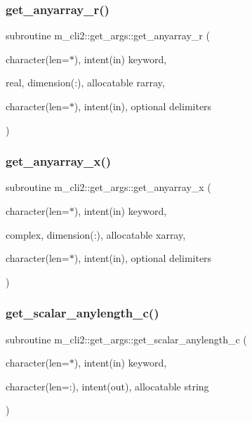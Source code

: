 \subsubsection{\texorpdfstring{get\+\_\+anyarray\+\_\+r()}{get\_anyarray\_r()}}
{\footnotesize\ttfamily subroutine m\+\_\+cli2\+::get\+\_\+args\+::get\+\_\+anyarray\+\_\+r (\begin{DoxyParamCaption}\item[{character(len=$\ast$), intent(in)}]{keyword,  }\item[{real, dimension(\+:), allocatable}]{rarray,  }\item[{character(len=$\ast$), intent(in), optional}]{delimiters }\end{DoxyParamCaption})\hspace{0.3cm}{\ttfamily [private]}}

\mbox{\label{interfacem__cli2_1_1get__args_a8581641c551aa6fe4c0592fb63de11fe}} 
\subsubsection{\texorpdfstring{get\+\_\+anyarray\+\_\+x()}{get\_anyarray\_x()}}
{\footnotesize\ttfamily subroutine m\+\_\+cli2\+::get\+\_\+args\+::get\+\_\+anyarray\+\_\+x (\begin{DoxyParamCaption}\item[{character(len=$\ast$), intent(in)}]{keyword,  }\item[{complex, dimension(\+:), allocatable}]{xarray,  }\item[{character(len=$\ast$), intent(in), optional}]{delimiters }\end{DoxyParamCaption})\hspace{0.3cm}{\ttfamily [private]}}

\mbox{\label{interfacem__cli2_1_1get__args_a42c3b7050881edf76682b7b0058b868a}} 
\subsubsection{\texorpdfstring{get\+\_\+scalar\+\_\+anylength\+\_\+c()}{get\_scalar\_anylength\_c()}}
{\footnotesize\ttfamily subroutine m\+\_\+cli2\+::get\+\_\+args\+::get\+\_\+scalar\+\_\+anylength\+\_\+c (\begin{DoxyParamCaption}\item[{character(len=$\ast$), intent(in)}]{keyword,  }\item[{character(len=\+:), intent(out), allocatable}]{string }\end{DoxyParamCaption})\hspace{0.3cm}{\ttfamily [private]}}

